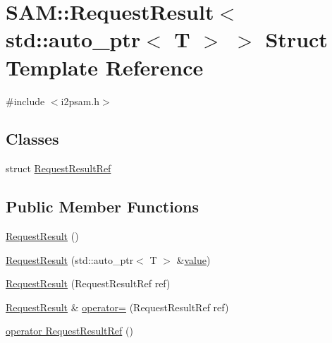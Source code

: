 \hypertarget{struct_s_a_m_1_1_request_result_3_01std_1_1auto__ptr_3_01_t_01_4_01_4}{}\section{S\+A\+M\+:\+:Request\+Result$<$ std\+:\+:auto\+\_\+ptr$<$ T $>$ $>$ Struct Template Reference}
\label{struct_s_a_m_1_1_request_result_3_01std_1_1auto__ptr_3_01_t_01_4_01_4}


{\ttfamily \#include $<$i2psam.\+h$>$}

\subsection*{Classes}
\begin{DoxyCompactItemize}
\item 
struct \hyperlink{struct_s_a_m_1_1_request_result_3_01std_1_1auto__ptr_3_01_t_01_4_01_4_1_1_request_result_ref}{Request\+Result\+Ref}
\end{DoxyCompactItemize}
\subsection*{Public Member Functions}
\begin{DoxyCompactItemize}
\item 
\hyperlink{struct_s_a_m_1_1_request_result_3_01std_1_1auto__ptr_3_01_t_01_4_01_4_a90a6d9cc8c781b5130a561a031055356}{Request\+Result} ()
\item 
\hyperlink{struct_s_a_m_1_1_request_result_3_01std_1_1auto__ptr_3_01_t_01_4_01_4_abb6b06c096b200a7ce6529565333feae}{Request\+Result} (std\+::auto\+\_\+ptr$<$ T $>$ \&\hyperlink{struct_s_a_m_1_1_request_result_3_01std_1_1auto__ptr_3_01_t_01_4_01_4_a3f70367e769b4a807ddbd522e6fb994d}{value})
\item 
\hyperlink{struct_s_a_m_1_1_request_result_3_01std_1_1auto__ptr_3_01_t_01_4_01_4_a45dd5f0d9c6051a475eef7f6425c9f3f}{Request\+Result} (Request\+Result\+Ref ref)
\item 
\hyperlink{struct_s_a_m_1_1_request_result}{Request\+Result} \& \hyperlink{struct_s_a_m_1_1_request_result_3_01std_1_1auto__ptr_3_01_t_01_4_01_4_a55d26139d33e9002833a3e1de676367d}{operator=} (Request\+Result\+Ref ref)
\item 
\hyperlink{struct_s_a_m_1_1_request_result_3_01std_1_1auto__ptr_3_01_t_01_4_01_4_a8211ea2b1bd4b12737be3ded33096867}{operator Request\+Result\+Ref} ()
\end{DoxyCompactItemize}

